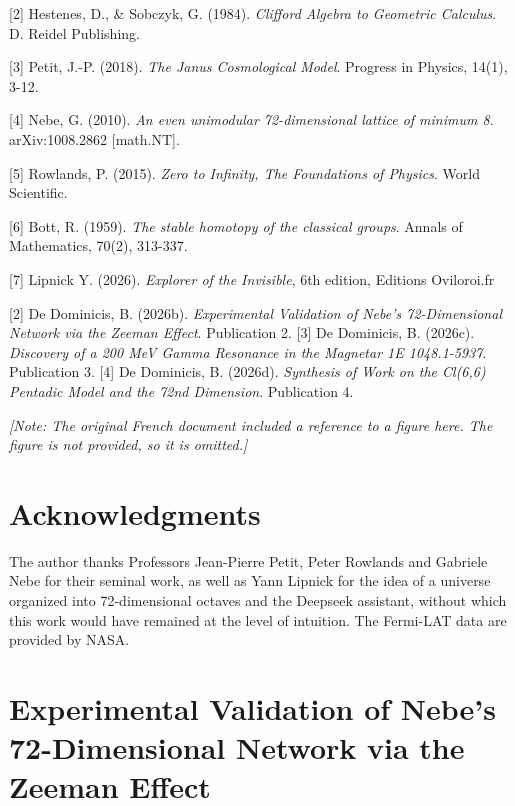 \documentclass[11pt]{article}
\begin{document}
{[}2{]} Hestenes, D., \& Sobczyk, G. (1984). \emph{Clifford Algebra to
Geometric Calculus}. D. Reidel Publishing.

{[}3{]} Petit, J.-P. (2018). \emph{The Janus Cosmological Model}.
Progress in Physics, 14(1), 3-12.

{[}4{]} Nebe, G. (2010). \emph{An even unimodular 72-dimensional lattice
of minimum 8}. arXiv:1008.2862 {[}math.NT{]}.

{[}5{]} Rowlands, P. (2015). \emph{Zero to Infinity, The Foundations of
Physics}. World Scientific.

{[}6{]} Bott, R. (1959). \emph{The stable homotopy of the classical
groups}. Annals of Mathematics, 70(2), 313-337.

{[}7{]} Lipnick Y. (2026). \emph{Explorer of the Invisible}, 6th
edition, Editions Oviloroi.fr

{[}2{]} De Dominicis, B. (2026b). \emph{Experimental Validation of
Nebe's 72-Dimensional Network via the Zeeman Effect}. Publication 2.
{[}3{]} De Dominicis, B. (2026c). \emph{Discovery of a 200 MeV Gamma
Resonance in the Magnetar 1E 1048.1-5937}. Publication 3. {[}4{]} De
Dominicis, B. (2026d). \emph{Synthesis of Work on the Cl(6,6) Pentadic
Model and the 72nd Dimension}. Publication 4.

\emph{{[}Note: The original French document included a reference to a
figure here. The figure is not provided, so it is omitted.{]}}

\hypertarget{acknowledgments}{%
\section{Acknowledgments}\label{acknowledgments}}

The author thanks Professors Jean-Pierre Petit, Peter Rowlands and
Gabriele Nebe for their seminal work, as well as Yann Lipnick for the
idea of a universe organized into 72-dimensional octaves and the
Deepseek assistant, without which this work would have remained at the
level of intuition. The Fermi-LAT data are provided by NASA.

\clearpage
{}

\hypertarget{experimental-validation-of-nebes-72-dimensional-network-via-the-zeeman-effect}{%
\section{Experimental Validation of Nebe's 72-Dimensional Network via
the Zeeman
Effect}\label{experimental-validation-of-nebes-72-dimensional-network-via-the-zeeman-effect}}
\end{document}
